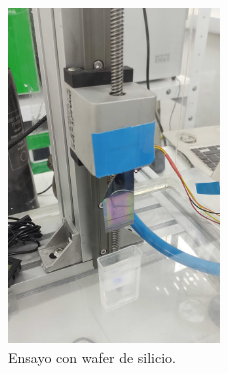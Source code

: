 \begin{figure}[h]
\centering 
\includegraphics[width=0.5\textwidth]{./Figures/prueba_a.jpg}
\caption{Ensayo con wafer de silicio.}
\label{fig:desplazamiento_lineal}
\end{figure}


